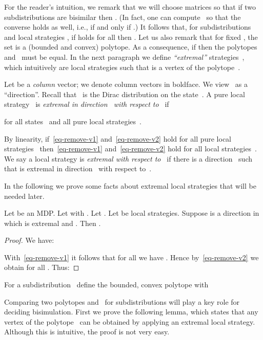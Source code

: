 For the reader's intuition, we remark that we will choose matrices  so that if two subdistributions  are bisimilar then .
(In fact, one can compute~ so that the converse holds as well, i.e.,  if and only if .)
It follows that, for subdistributions  and local strategies ,
if  holds for all  then .
Let us also remark that for fixed , the set  is a (bounded and convex) polytope.
As a consequence, if  then the polytopes  and~ must be equal.
In the next paragraph we define \emph{``extremal''} strategies~, which intuitively are local strategies such that  is a vertex of the polytope~.

Let  be a \emph{column} vector;
we denote column vectors in boldface.
We view~ as a ``direction''.
Recall that~ is the Dirac distribution on the state~.
A pure local strategy~ is \emph{extremal in direction~ with respect to~} if

for all states~ and all pure local strategies~.

By linearity, if~\eqref{eq-remove-v1} and~\eqref{eq-remove-v2} hold for all pure local strategies~ then~\eqref{eq-remove-v1} and~\eqref{eq-remove-v2} hold for all local strategies~.
We say a local strategy  is \emph{extremal with respect to~} if there is a direction~ such that  is extremal in direction~ with respect to~.

In the following we prove some facts about extremal local strategies that will be needed later.

\begin{lem}\label{lem-remove-v}
Let  be an MDP\@.
Let  with .
Let .
Let  be local strategies.
Suppose  is a direction in which  is extremal and
.
Then .
\end{lem}
\begin{proof}
We have:

With~\eqref{eq-remove-v1} it follows that for all  we have .
Hence by~\eqref{eq-remove-v2} we obtain  for all .
Thus:

\end{proof}

For a subdistribution~ define the bounded, convex polytope  with

Comparing two polytopes  and~ for subdistributions  will play a key role for deciding bisimulation.
First we prove the following lemma, which states that any vertex of the polytope~ can be obtained by applying an extremal local strategy.
Although this is intuitive, the proof is not very easy.

